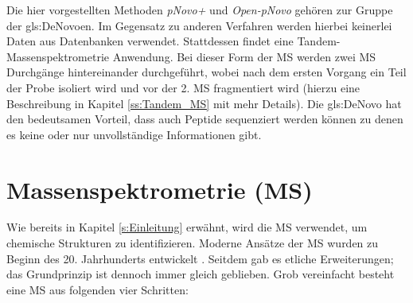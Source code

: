 \documentclass[a4paper, 12pt]{article}
\newcommand{\gerquot}[1]{\glqq#1\grqq}
\begin{document}
Die hier vorgestellten Methoden \emph{pNovo+} und \emph{Open-pNovo} gehören zur Gruppe der \gls{gls:DeNovo}en. Im Gegensatz zu anderen Verfahren werden hierbei keinerlei Daten aus Datenbanken verwendet. Stattdessen findet eine Tandem-Massenspektrometrie Anwendung. Bei dieser Form der MS werden zwei MS Durchgänge hintereinander durchgeführt, wobei nach dem ersten Vorgang ein Teil der Probe isoliert wird und vor der 2. MS \gerquot{fragmentiert} wird (hierzu eine Beschreibung in Kapitel \ref{ss:Tandem_MS} mit mehr Details). Die \gls{gls:DeNovo} hat den bedeutsamen Vorteil, dass auch Peptide sequenziert werden können zu denen es keine oder nur unvollständige Informationen gibt.






\section{Massenspektrometrie (MS)}\label{s:MS}
Wie bereits in Kapitel \ref{s:Einleitung} erwähnt, wird die MS verwendet, um chemische Strukturen zu identifizieren. Moderne Ansätze der MS wurden zu Beginn des 20. Jahrhunderts entwickelt \cite{griffiths2008brief}. Seitdem gab es etliche Erweiterungen; das Grundprinzip ist dennoch immer gleich geblieben. Grob vereinfacht besteht eine MS aus folgenden vier Schritten:
\end{document}
